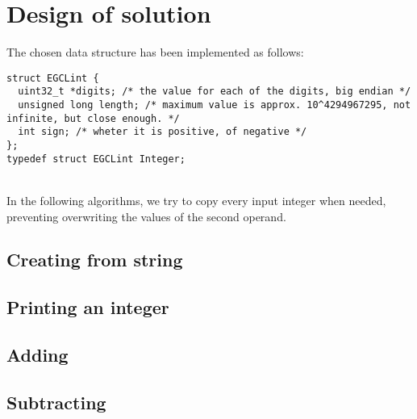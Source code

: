 \documentclass[a4paper,11pt]{article}
\begin{document}
\section{Design of solution}
The chosen data structure has been implemented as follows:
\begin{lstlisting}
struct EGCLint {
  uint32_t *digits; /* the value for each of the digits, big endian */
  unsigned long length; /* maximum value is approx. 10^4294967295, not infinite, but close enough. */
  int sign; /* wheter it is positive, of negative */
};
typedef struct EGCLint Integer;
\end{lstlisting}
\\
In the following algorithms, we try to copy every input integer when needed, preventing overwriting the values of the second operand.
\subsection{Creating from string}

\subsection{Printing an integer}

\subsection{Adding}

\subsection{Subtracting}
\end{document}
